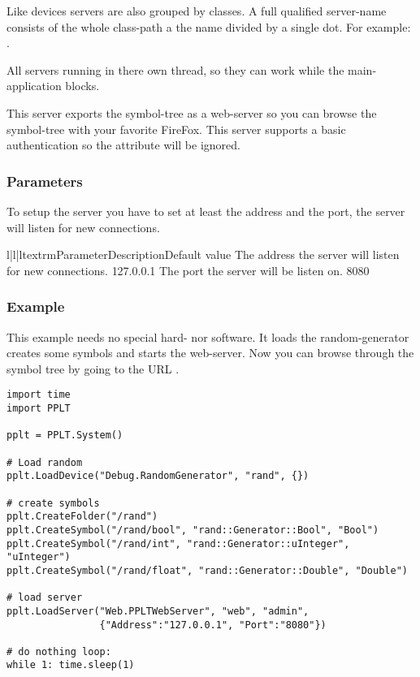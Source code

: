 Like devices servers are also grouped by classes. A full qualified server-name
consists of the whole class-path a the name divided by a single dot. For 
example: .

All servers running in there own thread, so they can work while the 
main-application blocks.


This server exports the symbol-tree as a web-server so you can browse the 
symbol-tree with your favorite FireFox. This server supports a basic 
authentication so the  attribute will be ignored.

\subsubsection{Parameters}
To setup the server you have to set at least the address and the port, the 
server will listen for new connections.
\begin{tableiii}{l|l|l}{textrm}{Parameter}{Description}{Default value}
        {The address the server will listen for new connections.}
        {127.0.0.1}
        {The port the server will be listen on.}
        {8080}
\end{tableiii}

\subsubsection{Example}
This example needs no special hard- nor software. It loads the random-generator
creates some symbols and starts the web-server. Now you can browse through the
symbol tree by going to the URL .
\begin{verbatim}
import time
import PPLT

pplt = PPLT.System()

# Load random
pplt.LoadDevice("Debug.RandomGenerator", "rand", {})

# create symbols
pplt.CreateFolder("/rand")
pplt.CreateSymbol("/rand/bool", "rand::Generator::Bool", "Bool")
pplt.CreateSymbol("/rand/int", "rand::Generator::uInteger", "uInteger")
pplt.CreateSymbol("/rand/float", "rand::Generator::Double", "Double")

# load server
pplt.LoadServer("Web.PPLTWebServer", "web", "admin", 
                {"Address":"127.0.0.1", "Port":"8080"})

# do nothing loop:
while 1: time.sleep(1)
    
\end{verbatim}





